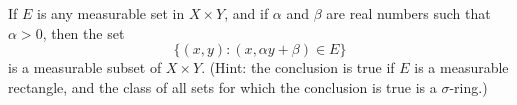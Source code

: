 If $E$ is any measurable set in $X \times Y$, and if $\alpha$ and $\beta$ are real numbers such that $\alpha > 0$, then the set
$$\{ (x,y) : (x, \alpha y + \beta) \in E \}$$
is a measurable subset of $X \times Y$. (Hint: the conclusion is true if $E$ is a measurable rectangle, and the class of all sets for which the conclusion is true is a $\sigma$-ring.)
